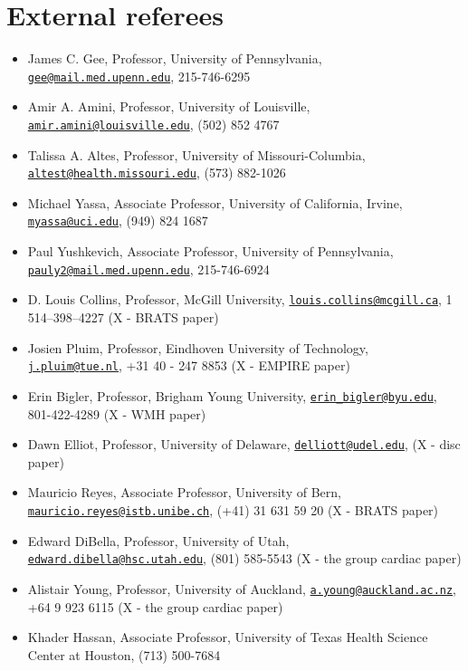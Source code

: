 \documentclass[12pt,]{article}
\providecommand{\tightlist}{%
  \setlength{\itemsep}{0pt}\setlength{\parskip}{0pt}}
\begin{document}
\section{External referees}\label{external-referees}

\begin{itemize}
\tightlist
\item
  James C. Gee, Professor, University of Pennsylvania,
  \href{mailto:gee@mail.med.upenn.edu}{\nolinkurl{gee@mail.med.upenn.edu}},
  215-746-6295
\item
  Amir A. Amini, Professor, University of Louisville,
  \href{mailto:amir.amini@louisville.edu}{\nolinkurl{amir.amini@louisville.edu}},
  (502) 852 4767
\item
  Talissa A. Altes, Professor, University of Missouri-Columbia,
  \href{mailto:altest@health.missouri.edu}{\nolinkurl{altest@health.missouri.edu}},
  (573) 882-1026
\item
  Michael Yassa, Associate Professor, University of California, Irvine,
  \href{mailto:myassa@uci.edu}{\nolinkurl{myassa@uci.edu}}, (949) 824
  1687
\item
  Paul Yushkevich, Associate Professor, University of Pennsylvania,
  \href{mailto:pauly2@mail.med.upenn.edu}{\nolinkurl{pauly2@mail.med.upenn.edu}},
  215-746-6924
\item
  D. Louis Collins, Professor, McGill University,
  \href{mailto:louis.collins@mcgill.ca}{\nolinkurl{louis.collins@mcgill.ca}},
  1 514--398--4227 (X - BRATS paper)
\item
  Josien Pluim, Professor, Eindhoven University of Technology,
  \href{mailto:j.pluim@tue.nl}{\nolinkurl{j.pluim@tue.nl}}, +31 40 - 247
  8853 (X - EMPIRE paper)
\item
  Erin Bigler, Professor, Brigham Young University,
  \href{mailto:erin_bigler@byu.edu}{\nolinkurl{erin\_bigler@byu.edu}},
  801-422-4289 (X - WMH paper)
\item
  Dawn Elliot, Professor, University of Delaware,
  \href{mailto:delliott@udel.edu}{\nolinkurl{delliott@udel.edu}}, (X -
  disc paper)
\item
  Mauricio Reyes, Associate Professor, University of Bern,
  \href{mailto:mauricio.reyes@istb.unibe.ch}{\nolinkurl{mauricio.reyes@istb.unibe.ch}},
  (+41) 31 631 59 20 (X - BRATS paper)
\item
  Edward DiBella, Professor, University of Utah,
  \href{mailto:edward.dibella@hsc.utah.edu}{\nolinkurl{edward.dibella@hsc.utah.edu}},
  (801) 585-5543 (X - the group cardiac paper)
\item
  Alistair Young, Professor, University of Auckland,
  \href{mailto:a.young@auckland.ac.nz}{\nolinkurl{a.young@auckland.ac.nz}},
  +64 9 923 6115 (X - the group cardiac paper)
\item
  Khader Hassan, Associate Professor, University of Texas Health Science
  Center at Houston, (713) 500-7684
\end{itemize}
\end{document}
